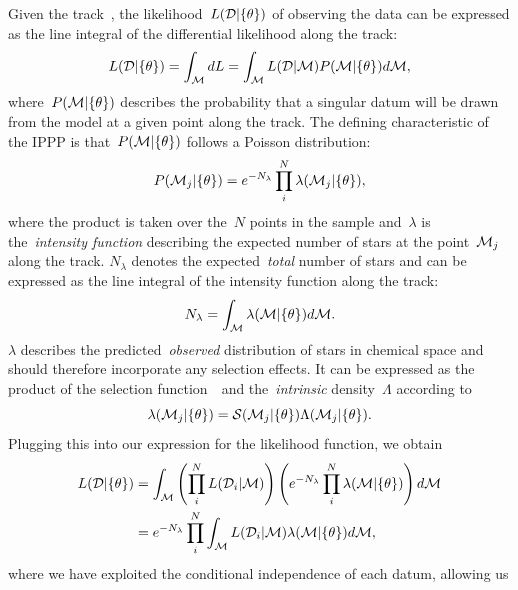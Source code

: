 \documentclass[ms.tex]{subfiles}
\begin{document}
Given the track~, the likelihood~$L(\mathcal{D} | \{\theta\})$ of
observing the data can be expressed as the line integral of the differential
likelihood along the track:
\begin{equation}
L(\mathcal{D} | \{\theta\}) = \int_{\mathcal{M}} dL =
\int_{\mathcal{M}} L(\mathcal{D} | \mathcal{M}) P(\mathcal{M} | \{\theta\})
d\mathcal{M},
\end{equation}
where~$P(\mathcal{M} | \{\theta\})$ describes the probability that a singular
datum will be drawn from the model at a given point along the track.
The defining characteristic of the IPPP is that~$P(\mathcal{M} | \{\theta\})$
follows a Poisson distribution:
\begin{equation}
P(\mathcal{M}_j | \{\theta\}) = e^{-N_\lambda}
\prod_i^N \lambda (\mathcal{M}_j | \{\theta\}),
\end{equation}
where the product is taken over the~$N$ points in the sample and~$\lambda$ is
the~\textit{intensity function} describing the expected number of stars at
the point~$\mathcal{M}_j$ along the track.
$N_\lambda$ denotes the expected~\textit{total} number of stars and can be
expressed as the line integral of the intensity function along the track:
\begin{equation}
N_\lambda = \int_{\mathcal{M}} \lambda(\mathcal{M} | \{\theta\}) d\mathcal{M}.
\end{equation}
$\lambda$ describes the predicted~\textit{observed} distribution of stars in
chemical space and should therefore incorporate any selection effects.
It can be expressed as the product of the selection function~~and
the~\textit{intrinsic} density~$\Lambda$ according to
\begin{equation}
\lambda(\mathcal{M}_j | \{\theta\}) = \mathcal{S}(\mathcal{M}_j | \{\theta\})
\Lambda(\mathcal{M}_j | \{\theta\}).
\end{equation}
Plugging this into our expression for the likelihood function, we obtain
\begin{subequations}\begin{align}
L(\mathcal{D} | \{\theta\}) &= \int_{\mathcal{M}}
\left(\prod_i^N L(\mathcal{D}_i | \mathcal{M})\right)
\left(e^{-N_\lambda} \prod_i^N \lambda(\mathcal{M} | \{\theta\})\right)
d\mathcal{M}
\\
&= e^{-N_\lambda} \prod_i^N \int_{\mathcal{M}} L(\mathcal{D}_i | \mathcal{M})
\lambda(\mathcal{M} | \{\theta\}) d\mathcal{M},
\end{align}\end{subequations}
where we have exploited the conditional independence of each datum, allowing us
\end{document}
